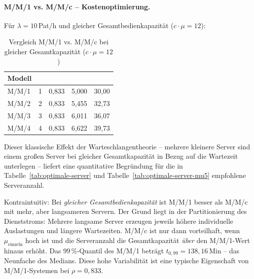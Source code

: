 ﻿\documentclass[a4paper,12pt]{report}
\theoremstyle{definition}
\begin{document}
\paragraph{M/M/1 vs. M/M/c -- Kostenoptimierung.}
Für $\lambda = 10$\,Pat/h und gleicher Gesamtbedienkapazität ($c \cdot \mu = 12$):

\begin{table}[H]
	\centering
	\begin{tabular}{@{}lrrrr@{}}
		\toprule
		\textbf{Modell} & \boldmath{$c$} & \boldmath{$\rho$} &
		\boldmath{$L$} & \boldmath{$W$ (Min)} \\
		\midrule
		M/M/1 & 1 & 0{,}833 & 5{,}000 & 30{,}00 \\
		M/M/2 & 2 & 0{,}833 & 5{,}455 & 32{,}73 \\
		M/M/3 & 3 & 0{,}833 & 6{,}011 & 36{,}07 \\
		M/M/4 & 4 & 0{,}833 & 6{,}622 & 39{,}73 \\
		\bottomrule
	\end{tabular}
	\caption{Vergleich M/M/1 vs. M/M/c bei gleicher Gesamtkapazität ($c \cdot \mu = 12$)}
\label{tab:mm1-vs-mmc}
	\label{tab:mmc-vergleich}
\end{table}

Dieser klassische Effekt der Warteschlangentheorie -- mehrere kleinere Server sind einem großen Server bei gleicher Gesamtkapazität in Bezug auf die Wartezeit unterlegen -- liefert eine quantitative Begründung für die in Tabelle~\ref{tab:optimale-server} und Tabelle~\ref{tab:optimale-server-mu5} empfohlene Serveranzahl.

Kontraintuitiv: Bei \emph{gleicher Gesamtbedienkapazität} ist M/M/1 besser
als M/M/c mit mehr, aber langsameren Servern. Der Grund liegt in der
Partitionierung des Dienststroms: Mehrere langsame Server erzeugen
jeweils höhere individuelle Auslastungen und längere Wartezeiten.
M/M/c ist nur dann vorteilhaft, wenn $\mu_\text{einzeln}$ hoch ist und
die Serveranzahl die Gesamtkapazität \emph{über} den M/M/1-Wert hinaus
erhöht. Das 99\,\%-Quantil des M/M/1 beträgt $t_{0{,}99} = 138{,}16$\,Min
-- das Neunfache des Medians. Diese hohe Variabilität ist eine typische
Eigenschaft von M/M/1-Systemen bei $\rho = 0{,}833$.
\end{document}
